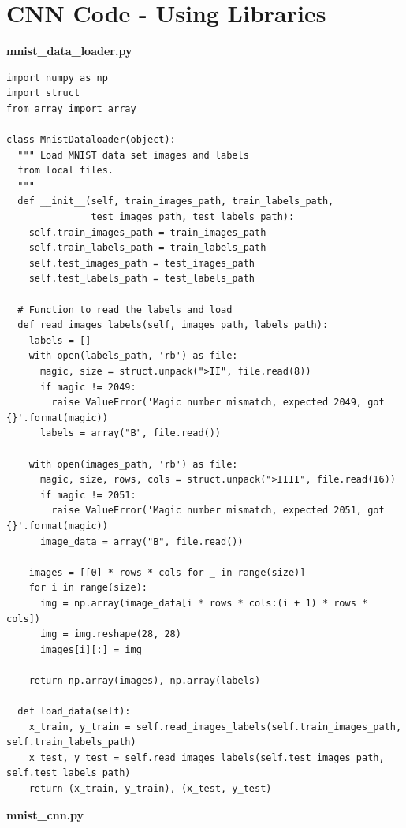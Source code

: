 \documentclass[a4paper]{article}
\begin{document}
\newpage
\section{CNN Code - Using Libraries}
\label{section:cnn-code}
\textbf{mnist\_data\_loader.py}
\begin{lstlisting}[basicstyle= \scriptsize]
import numpy as np
import struct
from array import array

class MnistDataloader(object):
  """ Load MNIST data set images and labels
  from local files.
  """
  def __init__(self, train_images_path, train_labels_path, 
               test_images_path, test_labels_path):
    self.train_images_path = train_images_path
    self.train_labels_path = train_labels_path
    self.test_images_path = test_images_path
    self.test_labels_path = test_labels_path
  
  # Function to read the labels and load
  def read_images_labels(self, images_path, labels_path):        
    labels = []
    with open(labels_path, 'rb') as file:
      magic, size = struct.unpack(">II", file.read(8))
      if magic != 2049:
        raise ValueError('Magic number mismatch, expected 2049, got {}'.format(magic))
      labels = array("B", file.read())        
    
    with open(images_path, 'rb') as file:
      magic, size, rows, cols = struct.unpack(">IIII", file.read(16))
      if magic != 2051:
        raise ValueError('Magic number mismatch, expected 2051, got {}'.format(magic))
      image_data = array("B", file.read())        

    images = [[0] * rows * cols for _ in range(size)]
    for i in range(size):
      img = np.array(image_data[i * rows * cols:(i + 1) * rows * cols])
      img = img.reshape(28, 28)
      images[i][:] = img            
    
    return np.array(images), np.array(labels)
          
  def load_data(self):
    x_train, y_train = self.read_images_labels(self.train_images_path, self.train_labels_path)
    x_test, y_test = self.read_images_labels(self.test_images_path, self.test_labels_path)
    return (x_train, y_train), (x_test, y_test)
\end{lstlisting}
\textbf{mnist\_cnn.py}
\end{document}
